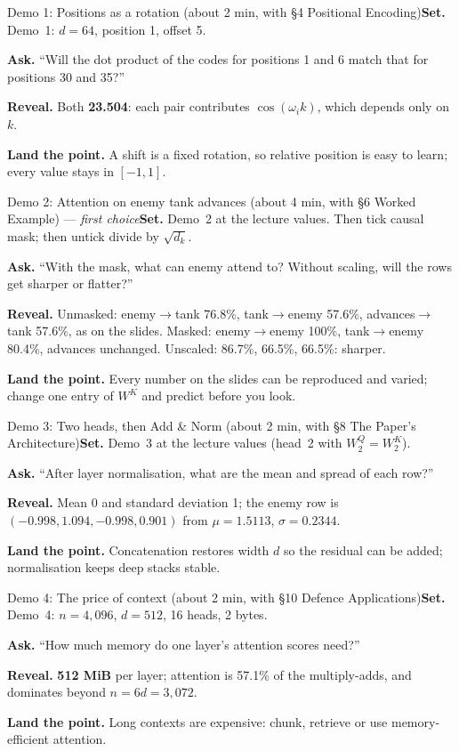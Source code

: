 \documentclass[11pt]{article}
\begin{document}
\begin{live}{Demo 1: Positions as a rotation (about 2 min, with \S4 Positional Encoding)}\textbf{Set.} Demo~1: $d=64$, position 1, offset 5.\par\smallskip\textbf{Ask.} ``Will the dot product of the codes for positions 1 and 6 match that for positions 30 and 35?''\par\smallskip\textbf{Reveal.} Both \textbf{23.504}: each pair contributes $\cos(\omega_ik)$, which depends only on $k$.\par\smallskip\textbf{Land the point.} A shift is a fixed rotation, so relative position is easy to learn; every value stays in $[-1,1]$.\end{live}

\begin{live}{Demo 2: Attention on enemy tank advances (about 4 min, with \S6 Worked Example) --- \emph{first choice}}\textbf{Set.} Demo~2 at the lecture values. Then tick \textsf{causal mask}; then untick \textsf{divide by $\sqrt{d_k}$}.\par\smallskip\textbf{Ask.} ``With the mask, what can enemy attend to? Without scaling, will the rows get sharper or flatter?''\par\smallskip\textbf{Reveal.} Unmasked: enemy$\to$tank 76.8\%, tank$\to$enemy 57.6\%, advances$\to$tank 57.6\%, as on the slides. Masked: enemy$\to$enemy 100\%, tank$\to$enemy 80.4\%, advances unchanged. Unscaled: 86.7\%, 66.5\%, 66.5\%: sharper.\par\smallskip\textbf{Land the point.} Every number on the slides can be reproduced and varied; change one entry of $W^K$ and predict before you look.\end{live}

\begin{live}{Demo 3: Two heads, then Add \& Norm (about 2 min, with \S8 The Paper's Architecture)}\textbf{Set.} Demo~3 at the lecture values (head~2 with $W^Q_2=W^K_2$).\par\smallskip\textbf{Ask.} ``After layer normalisation, what are the mean and spread of each row?''\par\smallskip\textbf{Reveal.} Mean 0 and standard deviation 1; the enemy row is $(-0.998,1.094,-0.998,0.901)$ from $\mu=1.5113$, $\sigma=0.2344$.\par\smallskip\textbf{Land the point.} Concatenation restores width $d$ so the residual can be added; normalisation keeps deep stacks stable.\end{live}

\begin{live}{Demo 4: The price of context (about 2 min, with \S10 Defence Applications)}\textbf{Set.} Demo~4: $n=4{,}096$, $d=512$, 16 heads, 2 bytes.\par\smallskip\textbf{Ask.} ``How much memory do one layer's attention scores need?''\par\smallskip\textbf{Reveal.} \textbf{512 MiB} per layer; attention is 57.1\% of the multiply-adds, and dominates beyond $n=6d=3{,}072$.\par\smallskip\textbf{Land the point.} Long contexts are expensive: chunk, retrieve or use memory-efficient attention.\end{live}
\end{document}
